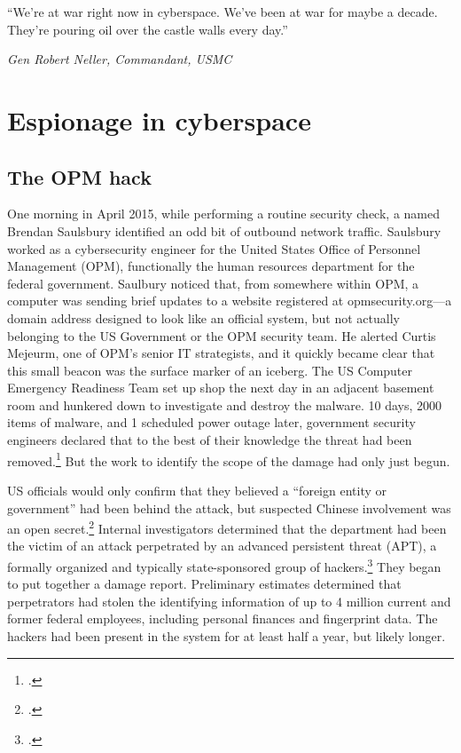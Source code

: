 \documentclass{memoir}
\begin{document}
\begin{refsegment}
\epigraph{``We're at war right now in cyberspace. We've been at war for maybe a decade. They're pouring oil over the castle walls every day.''}{\emph{Gen Robert Neller, Commandant, USMC}}

\section{Espionage in cyberspace}
\subsection{The OPM hack}
One morning in April 2015, while performing a routine security check, a named Brendan Saulsbury identified an odd bit of outbound network traffic. Saulsbury worked as a cybersecurity engineer for the United States Office of Personnel Management (OPM), functionally the human resources department for the federal government. Saulbury noticed that, from somewhere within OPM, a computer was sending brief updates to a website registered at opmsecurity.org---a domain address designed to look like an official system, but not actually belonging to the US Government or the OPM security team. He alerted Curtis Mejeurm, one of OPM's senior IT strategists, and it quickly became clear that this small beacon was the surface marker of an iceberg. The US Computer Emergency Readiness Team set up shop the next day in an adjacent basement room and hunkered down to investigate and destroy the malware. 10 days, 2000 items of malware, and 1 scheduled power outage later, government security engineers declared that to the best of their knowledge the threat had been removed.\footcite{koerner_inside_2016} But the work to identify the scope of the damage had only just begun.

US officials would only confirm that they believed a ``foreign entity or government'' had been behind the attack, but suspected Chinese involvement was an open secret.\footcite{spetalnick_china_2015} Internal investigators determined that the department had been the victim of an attack perpetrated by an advanced persistent threat (APT), a formally organized and typically state-sponsored group of hackers.\footcite[Attributing a cyberattack is difficult because hackers have endless means to obscure their orgins. In this case, however, the first clue that investigators found was left there on purpose. A particularly effective group of hackers tied to China has made it a calling card of sorts to register sites using the names of members of Marvel's comic book superhero group, The Avengers. In this case, opmsecurity.org was registered under the name ``Steve Rogers,'' better known as Captain America.]{koerner_inside_2016} They began to put together a damage report. Preliminary estimates determined that perpetrators had stolen the identifying information of up to 4 million current and former federal employees, including personal finances and fingerprint data. The hackers had been present in the system for at least half a year, but likely longer.


\end{refsegment}
\end{document}

